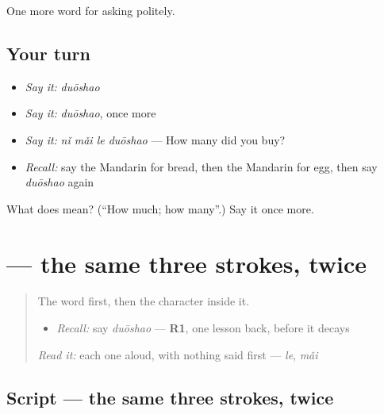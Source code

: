 \begin{grammarlens}[title={What you've built}]
One more word for asking politely.
\end{grammarlens}

\subsection*{Your turn}
\begin{itemize}
\raggedright
  \item \emph{Say it:} \emph{duōshao}
  \item \emph{Say it:} \emph{duōshao}, once more
  \item \emph{Say it:} \emph{nǐ mǎi le duōshao} — How many did you buy?
  \item \emph{Recall:} say the Mandarin for bread, then the Mandarin for egg, then say \emph{duōshao} again
\end{itemize}

\begin{tcolorbox}[breakable,colback=teal!4,colframe=teal!35!black,title={Before you move on}]
What does  mean? (\textquotedblleft{}How much; how many\textquotedblright{}.) Say it once more.
\end{tcolorbox}
\section[\texorpdfstring{\zh{多} (duō)}{多 (duō)}]{ — the same three strokes, twice}

\label{lesson:ZH-W41-duo}



\begin{quote}
The word first, then the character inside it.

\begin{itemize}
\raggedright
  \item \emph{Recall:} say \emph{duōshao} — \textbf{R1}, one lesson back, before it decays
\end{itemize}

\begin{quote}
 
\end{quote}

\emph{Read it:} each one aloud, with nothing said first — \emph{le}, \emph{mǎi}
\end{quote}

\subsection*{Script — the same three strokes, twice}

